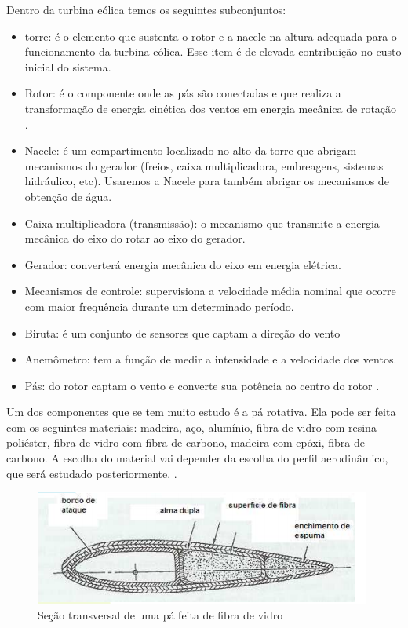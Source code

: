 Dentro da turbina eólica temos os seguintes subconjuntos: 
\begin{itemize}
\item torre: é o elemento que sustenta o rotor e a nacele na altura adequada para o funcionamento da turbina eólica. Esse item é de elevada 	contribuição no custo inicial do sistema.
\item Rotor: 	é o componente onde as pás são conectadas e que realiza a 	transformação de energia cinética dos ventos em energia mecânica 	de rotação \cite{rossiEtAl}.
\item Nacele: é um compartimento localizado no alto da torre que abrigam 	mecanismos do gerador (freios, caixa multiplicadora, embreagens, 	sistemas hidráulico, etc). Usaremos a Nacele para também abrigar 	os mecanismos de obtenção de água.
\item Caixa 	multiplicadora (transmissão): o mecanismo que transmite a energia 	mecânica do eixo do rotar ao eixo do gerador. 	
\item Gerador: 	converterá energia mecânica do eixo em energia elétrica.
\item Mecanismos 	de controle: supervisiona a velocidade média nominal que ocorre com 	maior frequência durante um determinado período.
\item Biruta: 	é um conjunto de sensores que captam a direção do vento
\item Anemômetro: tem a função de medir a intensidade e a velocidade dos ventos. 	
\item Pás: 	do rotor captam o vento e converte sua potência ao centro do rotor \cite{rossiEtAl}.	 	

\end{itemize}

Um dos componentes que se tem muito estudo é a pá rotativa. Ela pode ser feita com os seguintes materiais: 
madeira, aço, alumínio, fibra de vidro com resina poliéster, fibra de vidro com fibra de carbono, madeira com epóxi,
fibra de carbono. A escolha do material vai depender da escolha do perfil aerodinâmico, que será estudado posteriormente.
\cite{portalEnergia}.

\begin{figure}[!htbp]
\centering
\includegraphics[scale=0.80]{editaveis/figuras/pa}
\caption[Seção transversal de uma pá feita de fibra de vidro]{Seção transversal de uma pá feita de fibra de vidro\footnotemark}
\FloatBarrier
\label{secao_transversal_pa}
\end{figure}


